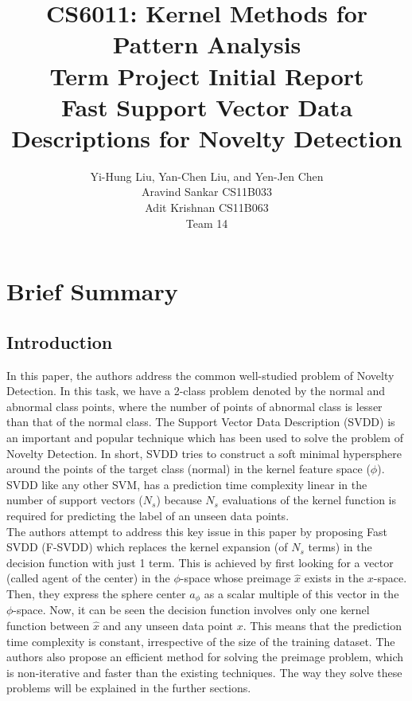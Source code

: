 \documentclass{article}
\begin{document}
\title{\textbf{CS6011: Kernel Methods for Pattern Analysis}
\\
\textbf{Term Project Initial Report \\[10pt]} 
\textbf{Fast Support Vector Data Descriptions
for Novelty Detection
}
}
\author{
Yi-Hung Liu, Yan-Chen Liu, and Yen-Jen Chen \\[10pt]
Aravind Sankar CS11B033 \\
Adit Krishnan CS11B063 \\[0.2in]
Team 14
}
\maketitle
\tableofcontents 
\newpage

\section{Brief Summary}
\subsection{Introduction}

In this paper, the authors address the common well-studied problem of Novelty Detection. In this task, we have a 2-class problem denoted by the normal and abnormal class points, where the number of points of abnormal class is lesser than that of the normal class. The Support Vector Data Description (SVDD) is an important and popular technique which has been used to solve the problem of Novelty Detection. In short, SVDD tries to construct a soft minimal hypersphere around the points of the target class (normal) in the kernel feature space ($\phi$). SVDD like any other SVM, has a prediction time complexity linear in the number of support vectors ($N_s$) because $N_s$ evaluations of the kernel function is required for predicting the label of an unseen data points. \\[10pt]

The authors attempt to address this key issue in this paper by proposing Fast SVDD (F-SVDD) which replaces the kernel expansion (of $N_s$ terms) in the decision function with just 1 term. This is achieved by first looking for a vector (called agent of the center) in the $\phi$-space whose preimage $\hat{x}$ exists in the $x$-space. Then, they express the sphere center $a_{\phi}$ as a scalar multiple of this vector in the $\phi$-space. Now, it can be seen the decision function involves only one kernel function between $\hat{x}$ and any unseen data point $x$. This means that the prediction time complexity is constant, irrespective of the size of the training dataset. The authors also propose an efficient method for solving the preimage problem, which is non-iterative and faster than the existing techniques. The way they solve these problems will be explained in the further sections.
\end{document}

